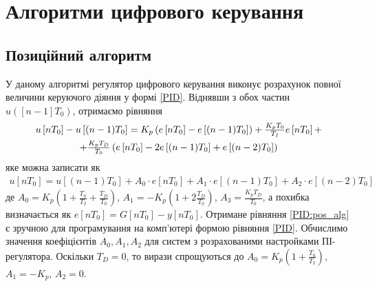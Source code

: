 \chapter{Алгоритми цифрового керування}
\section{Позиційний алгоритм}
У даному алгоритмі регулятор цифрового керування виконує розрахунок повної величини
керуючого діяння у формі \eqref{PID}. Віднявши з обох частин $u\left([n-1] T_0\right)$,
отримаємо рівняння
\begin{gather*}
    \mbox{\normalsize $u\left[n T_0\right] - u\left[(n-1) T_0\right] = K_p \left(
        e\left[n T_0\right] - e\left[(n-1) T_0\right]
    \right) + 
    \frac{K_p T_0}{T_I} e\left[n T_0\right] + $}
    \\ 
    \mbox{\normalsize $ + \frac{K_p T_D}{T_0} \left(
        e\left[n T_0\right] - 2e\left[(n-1) T_0\right] + e\left[(n-2) T_0\right]
    \right)$}
\end{gather*}
яке можна записати як
\begin{gather}\label{PID:pos_alg}
    u\left[n T_0\right] = u\left[(n-1) T_0\right] + 
    A_0 \cdot e\left[n T_0\right] + A_1 \cdot e\left[(n-1) T_0\right] + A_2 \cdot e\left[(n-2) T_0\right]
\end{gather}
де $A_0 = K_p \left(1 + \frac{T_0}{T_I} + \frac{T_D}{T_0}\right)$,
$A_1 = -K_p \left(1 + 2\frac{T_D}{T_0}\right)$, $A_3 = \frac{K_p T_D}{T_0}$, а похибка визначається як
$e\left[n T_0\right] = G\left[n T_0\right] - y\left[n T_0\right]$.
Отримане рівняння \eqref{PID:pos_alg} є зручною для програмування на комп'ютері формою рівняння
\eqref{PID}.
Обчислимо значення коефіцієнтів $A_0, A_1, A_2$ для систем з розрахованими настройками ПІ-регулятора.
Оскільки $T_D = 0$, то вирази спрощуються до $A_ 0 = K_p\left(1 + \frac{T_0}{T_I}\right)$,
$A_1 = -K_p$, $A_2 = 0$.
